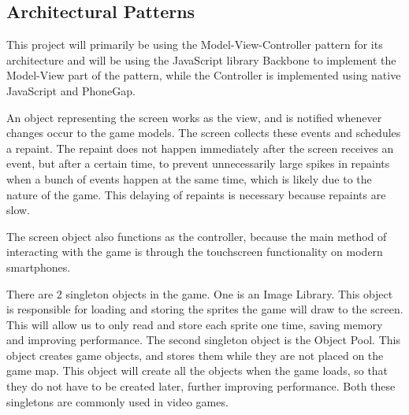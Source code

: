\subsection{Architectural Patterns}

This project will primarily be using the Model-View-Controller pattern for its architecture and will be using the JavaScript library Backbone to implement the Model-View part of the pattern, while the Controller is implemented using native JavaScript and PhoneGap.

An object representing the screen works as the view, and is notified whenever changes occur to the game models. The screen collects these events and schedules a repaint. The repaint does not happen immediately after the screen receives an event, but after a certain time, to prevent unnecessarily large spikes in repaints when a bunch of events happen at the same time, which is likely due to the nature of the game. This delaying of repaints is necessary because repaints are slow.

The screen object also functions as the controller, because the main method of interacting with the game is through the touchscreen functionality on modern smartphones.

There are 2 singleton objects in the game. One is an Image Library. This object is responsible for loading and storing the sprites the game will draw to the screen. This will allow us to only read and store each sprite one time, saving memory and improving performance. The second singleton object is the Object Pool. This object creates game objects, and stores them while they are not placed on the game map. This object will create all the objects when the game loads, so that they do not have to be created later, further improving performance. Both these singletons are commonly used in video games.
